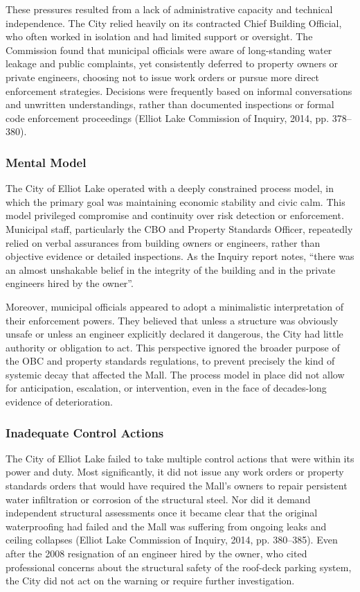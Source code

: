 \documentclass[12pt]{article}
\begin{document}
These pressures resulted from a lack of administrative capacity and technical independence. The City relied heavily on its contracted Chief Building Official, who often worked in isolation and had limited support or oversight. The Commission found that municipal officials were aware of long-standing water leakage and public complaints, yet consistently deferred to property owners or private engineers, choosing not to issue work orders or pursue more direct enforcement strategies. Decisions were frequently based on informal conversations and unwritten understandings, rather than documented inspections or formal code enforcement proceedings (Elliot Lake Commission of Inquiry, 2014, pp. 378–380).

\subsubsection*{Mental Model}
The City of Elliot Lake operated with a deeply constrained process model, in which the primary goal was maintaining economic stability and civic calm. This model privileged compromise and continuity over risk detection or enforcement. Municipal staff, particularly the CBO and Property Standards Officer, repeatedly relied on verbal assurances from building owners or engineers, rather than objective evidence or detailed inspections. As the Inquiry report notes, “there was an almost unshakable belief in the integrity of the building and in the private engineers hired by the owner”.

Moreover, municipal officials appeared to adopt a minimalistic interpretation of their enforcement powers. They believed that unless a structure was obviously unsafe or unless an engineer explicitly declared it dangerous, the City had little authority or obligation to act. This perspective ignored the broader purpose of the OBC and property standards regulations, to prevent precisely the kind of systemic decay that affected the Mall. The process model in place did not allow for anticipation, escalation, or intervention, even in the face of decades-long evidence of deterioration.

\subsubsection*{Inadequate Control Actions}
The City of Elliot Lake failed to take multiple control actions that were within its power and duty. Most significantly, it did not issue any work orders or property standards orders that would have required the Mall’s owners to repair persistent water infiltration or corrosion of the structural steel. Nor did it demand independent structural assessments once it became clear that the original waterproofing had failed and the Mall was suffering from ongoing leaks and ceiling collapses (Elliot Lake Commission of Inquiry, 2014, pp. 380–385). Even after the 2008 resignation of an engineer hired by the owner, who cited professional concerns about the structural safety of the roof-deck parking system, the City did not act on the warning or require further investigation.
\end{document}
